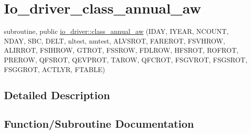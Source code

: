 \hypertarget{group__io__driver__class__annual__aw}{}\section{Io\+\_\+driver\+\_\+class\+\_\+annual\+\_\+aw}
\label{group__io__driver__class__annual__aw}
\begin{DoxyCompactItemize}
\item 
subroutine, public \hyperlink{group__io__driver__class__annual__aw_gaa89ed6fc9e92f8b96f493efb9f0e345c}{io\+\_\+driver\+::class\+\_\+annual\+\_\+aw} (I\+D\+A\+Y, I\+Y\+E\+A\+R, N\+C\+O\+U\+N\+T, N\+D\+A\+Y, S\+B\+C, D\+E\+L\+T, nltest, nmtest, A\+L\+V\+S\+R\+O\+T, F\+A\+R\+E\+R\+O\+T, F\+S\+V\+H\+R\+O\+W, A\+L\+I\+R\+R\+O\+T, F\+S\+I\+H\+R\+O\+W, G\+T\+R\+O\+T, F\+S\+S\+R\+O\+W, F\+D\+L\+R\+O\+W, H\+F\+S\+R\+O\+T, R\+O\+F\+R\+O\+T, P\+R\+E\+R\+O\+W, Q\+F\+S\+R\+O\+T, Q\+E\+V\+P\+R\+O\+T, T\+A\+R\+O\+W, Q\+F\+C\+R\+O\+T, F\+S\+G\+V\+R\+O\+T, F\+S\+G\+S\+R\+O\+T, F\+S\+G\+G\+R\+O\+T, A\+C\+T\+L\+Y\+R, F\+T\+A\+B\+L\+E)
\end{DoxyCompactItemize}


\subsection{Detailed Description}


\subsection{Function/\+Subroutine Documentation}
\hypertarget{group__io__driver__class__annual__aw_gaa89ed6fc9e92f8b96f493efb9f0e345c}{}
